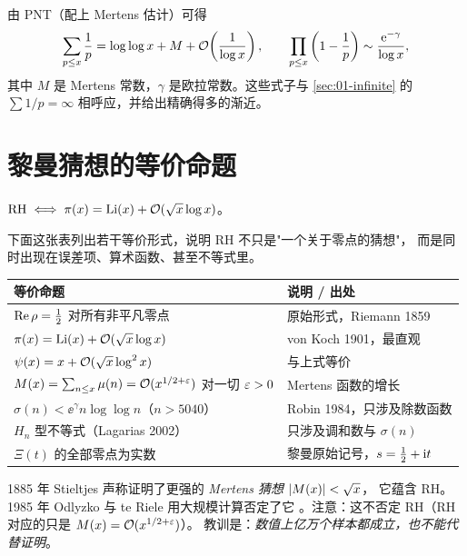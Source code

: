 由 PNT（配上 Mertens 估计）可得
\begin{equation}\label{eq:04-coro}
  \sum_{p\le x}\frac1p=\log\log x+M+\mathcal{O}\!\left(\frac1{\log x}\right),\qquad
  \prod_{p\le x}\left(1-\frac1p\right)\sim\frac{\mathrm{e}^{-\gamma}}{\log x},
\end{equation}
其中 $M$ 是 Mertens 常数，$\gamma$ 是欧拉常数。这些式子与
\cref{sec:01-infinite} 的 $\sum1/p=\infty$ 相呼应，并给出精确得多的渐近。

\section{黎曼猜想的等价命题}
\label{sec:04-equivalents}

\begin{theorem}\label{thm:04-vonkoch}
$\mathrm{RH}\iff\pi(x)=\operatorname{Li}(x)+\mathcal{O}(\sqrt{x}\log x)$。
\end{theorem}

下面这张表列出若干等价形式，说明 RH 不只是"一个关于零点的猜想"，
而是同时出现在误差项、算术函数、甚至不等式里。

\begin{center}\small
\begin{tabular}{@{}p{}p{}@{}}
\toprule
\textbf{等价命题} & \textbf{说明 / 出处}\\
\midrule
$\operatorname{Re}\rho=\tfrac12$ 对所有非平凡零点 & 原始形式，Riemann 1859\\
$\pi(x)=\operatorname{Li}(x)+\mathcal{O}(\sqrt{x}\log x)$ & von Koch 1901，最直观\\
$\psi(x)=x+\mathcal{O}(\sqrt{x}\log^2 x)$ & 与上式等价\\
$M(x)=\sum_{n\le x}\mu(n)=\mathcal{O}(x^{1/2+\varepsilon})$ 对一切 $\varepsilon>0$ & Mertens 函数的增长\\
$\sigma(n)<\ee^{\gamma}n\log\log n$（$n>5040$） & Robin 1984，只涉及除数函数\\
$H_n$ 型不等式（Lagarias 2002） & 只涉及调和数与 $\sigma(n)$\\
$\Xi(t)$ 的全部零点为实数 & 黎曼原始记号，$s=\tfrac12+\mathrm{i} t$\\
\bottomrule
\end{tabular}
\end{center}

\begin{warnbox}
1885 年 Stieltjes 声称证明了更强的 \emph{Mertens 猜想} $\left\lvert M(x)\right\rvert<\sqrt{x}$，
它蕴含 RH。1985 年 Odlyzko 与 te Riele 用大规模计算否定了它
\cite{odlyzko1985}。注意：这不否定 RH（RH 对应的只是 $M(x)=\mathcal{O}(x^{1/2+\varepsilon})$）。
教训是：\emph{数值上亿万个样本都成立，也不能代替证明}。
\end{warnbox}

